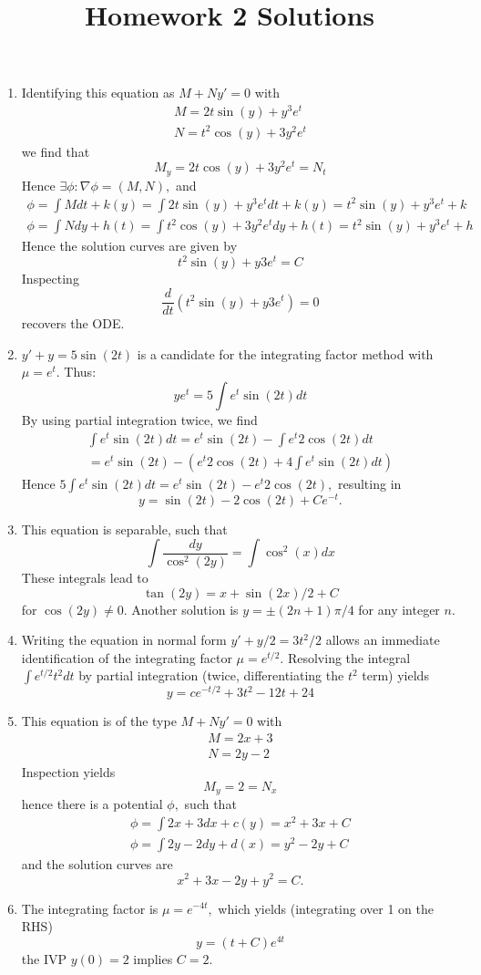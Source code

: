 \documentclass[10pt,a4paper]{article}
\title{Homework 2 Solutions}
\date{}
\begin{document}
\maketitle
\begin{enumerate}
\item Identifying this equation as $M + Ny' = 0$ with 
\begin{align*}
M = 2t \sin(y) + y^3 e^{t} \\
N = t^2 \cos(y) + 3y^2 e^t
\end{align*}
we find that 
\[ M_y = 2t \cos(y) + 3 y^2 e^t = N_t \]
Hence $\exists \phi: \nabla \phi = (M,N),$ and 
\begin{align*}
\phi = \int M dt +k(y) = \int 2t \sin(y) + y^3 e^t dt + k(y) = t^2 \sin(y) + y^3 e^t + k \\
\phi = \int N dy + h(t) = \int t^2 \cos(y) + 3y^2 e^t dy + h(t) = t^2 \sin(y) + y^3 e^t + h
\end{align*}
Hence the solution curves are given by 
\[ t^2 \sin(y) + y3 e^t = C \]
Inspecting
\[ \frac{d}{dt}( t^2 \sin(y) + y3 e^t) = 0 \]
recovers the ODE.
\item $y' + y = 5 \sin(2t)$ is a candidate for the integrating factor method with $\mu = e^t.$ Thus:
\[ y e^t = 5 \int e^t \sin(2t) dt \] 
By using partial integration twice, we find 
\begin{align*}
\int e^t \sin(2t) dt = e^t \sin(2t) - \int e^t 2 \cos(2t) dt  \\
= e^t \sin(2t) - \left( e^t 2 \cos(2t) + 4 \int e^t \sin(2t) dt \right)
\end{align*}
Hence $5 \int e^t \sin(2t) dt = e^t \sin(2t) - e^t 2 \cos(2t),$ resulting in 
\[ y = \sin(2t) - 2 \cos(2t) + Ce^{-t}. \]
\item This equation is separable, such that 
\[ \int \frac{dy}{\cos^2(2y)} = \int \cos^2(x) dx \]
These integrals lead to 
\[ \tan(2y) = x + \sin(2x)/2 + C \]
for $\cos(2y) \neq 0.$ Another solution is $ y = \pm(2n+1) \pi/4$ for any integer $n$.
\item Writing the equation in normal form $y' + y/2 = 3t^2/2$ allows an immediate identification of the integrating factor $\mu = e^{t/2}.$ Resolving the integral $\int e^{t/2} t^2 dt$ by partial integration (twice, differentiating the $t^2$ term) yields
\[ y = c e^{-t/2} + 3t^2 - 12t + 24 \]
\item This equation is of the type $M + Ny' = 0$ with 
\begin{align*}
M = 2x + 3\\
N = 2y - 2
\end{align*}
Inspection yields
\[ M_y = 2 = N_x \]
hence there is a potential $\phi,$ such that 
\begin{align*}
\phi = \int 2x +3 dx + c(y) = x^2 + 3x + C \\
\phi = \int 2y -2 dy + d(x) = y^2 - 2y + C
\end{align*}
and the solution curves are 
\[ x^2 + 3x - 2y + y^2 = C. \]
\item The integrating factor is $\mu = e^{-4t},$ which yields (integrating over 1 on the RHS)
\[ y = (t+C)e^{4t} \]
the IVP $y(0) = 2$ implies $C = 2.$

\end{enumerate}
\end{document}
